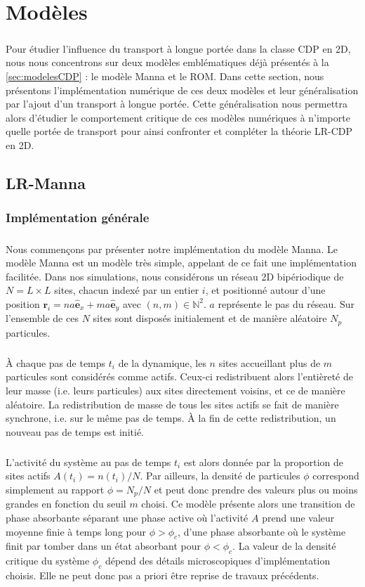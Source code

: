 \section{Modèles}

\subparagraph{}Pour étudier l'influence du transport à longue portée dans la classe CDP en 2D, nous nous concentrons sur deux modèles emblématiques déjà présentés à la \autoref{sec:modelesCDP} : le modèle Manna et le ROM. Dans cette section, nous présentons l'implémentation numérique de ces deux modèles et leur généralisation par l'ajout d'un transport à longue portée. Cette généralisation nous permettra alors d'étudier le comportement critique de ces modèles numériques à n'importe quelle portée de transport pour ainsi confronter et compléter la théorie LR-CDP en 2D.

\subsection{LR-Manna}

\label{sec:ImplementationManna}

\subsubsection{Implémentation générale}

\subparagraph{}Nous commençons par présenter notre implémentation du modèle Manna. Le modèle Manna est un modèle très simple, appelant de ce fait une implémentation facilitée. Dans nos simulations, nous considérons un réseau 2D bipériodique de $N=L\times L$ sites, chacun indexé par un entier $i$, et positionné autour d'une position $\mathbf{r}_i = na\hat{\mathbf{e}}_x + ma \hat{\mathbf{e}}_y$ avec $(n,m) \in \mathbb{N}^2$. $a$ représente le pas du réseau. Sur l'ensemble de ces $N$ sites sont disposés initialement et de manière aléatoire $N_p$ particules.

\subparagraph{}\`A chaque pas de temps $t_i$ de la dynamique, les $n$ sites accueillant plus de $m$ particules sont considérés comme actifs. Ceux-ci redistribuent alors l'entièreté de leur masse (i.e. leurs particules) aux sites directement voisins, et ce de manière aléatoire. La redistribution de masse de tous les sites actifs se fait de manière synchrone, i.e. sur le même pas de temps. \`A la fin de cette redistribution, un nouveau pas de temps est initié.

\subparagraph{}L'activité du système au pas de temps $t_i$ est alors donnée par la proportion de sites actifs $A(t_i) = n(t_i)/N$. Par ailleurs, la densité de particules $\phi$ correspond simplement au rapport $\phi = N_p/N$ et peut donc prendre des valeurs plus ou moins grandes en fonction du seuil $m$ choisi. Ce modèle présente alors une transition de phase absorbante séparant une phase active où l'activité $A$ prend une valeur moyenne finie à temps long pour $\phi>\phi_c$, d'une phase absorbante où le système finit par tomber dans un état absorbant pour $\phi<\phi_c$. La valeur de la densité critique du système $\phi_c$ dépend des détails microscopiques d'implémentation choisis. Elle ne peut donc pas a priori être reprise de travaux précédents. 

